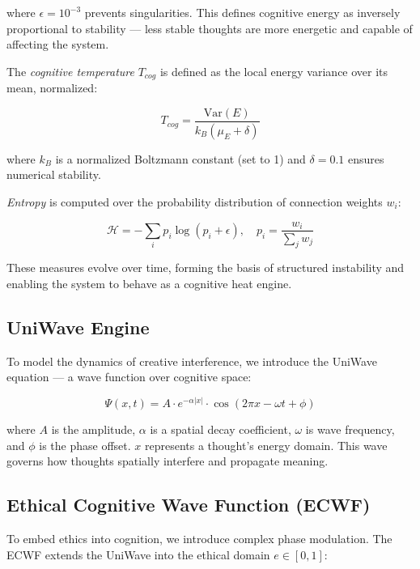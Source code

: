 \documentclass{article}
\begin{document}
\noindent where $\epsilon = 10^{-3}$ prevents singularities. This defines cognitive energy as inversely proportional to stability — less stable thoughts are more energetic and capable of affecting the system.

The \textit{cognitive temperature} $T_{cog}$ is defined as the local energy variance over its mean, normalized:

\begin{equation}
T_{cog} = \frac{\mathrm{Var}(E)}{k_B (\mu_E + \delta)}
\end{equation}

\noindent where $k_B$ is a normalized Boltzmann constant (set to 1) and $\delta = 0.1$ ensures numerical stability.

\textit{Entropy} is computed over the probability distribution of connection weights $w_i$:

\begin{equation}
\mathcal{H} = -\sum_i p_i \log (p_i + \epsilon), \quad p_i = \frac{w_i}{\sum_j w_j}
\end{equation}

These measures evolve over time, forming the basis of structured instability and enabling the system to behave as a cognitive heat engine.

\subsection{UniWave Engine}

To model the dynamics of creative interference, we introduce the UniWave equation — a wave function over cognitive space:

\begin{equation}
\Psi(x, t) = A \cdot e^{-\alpha |x|} \cdot \cos(2\pi x - \omega t + \phi)
\end{equation}

\noindent where $A$ is the amplitude, $\alpha$ is a spatial decay coefficient, $\omega$ is wave frequency, and $\phi$ is the phase offset. $x$ represents a thought’s energy domain. This wave governs how thoughts spatially interfere and propagate meaning.

\subsection{Ethical Cognitive Wave Function (ECWF)}

To embed ethics into cognition, we introduce complex phase modulation. The ECWF extends the UniWave into the ethical domain $e \in [0,1]$:
\end{document}
